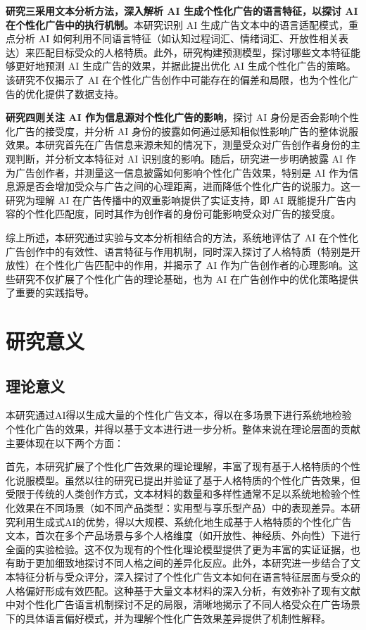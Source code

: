 \textbf{研究三采用文本分析方法，深入解析 AI 生成个性化广告的语言特征，以探讨 AI 在个性化广告中的执行机制。}本研究识别 AI 生成广告文本中的语言适配模式，重点分析 AI 如何利用不同语言特征（如认知过程词汇、情绪词汇、开放性相关表达）来匹配目标受众的人格特质。此外，研究构建预测模型，探讨哪些文本特征能够更好地预测 AI 生成广告的效果，并据此提出优化 AI 生成个性化广告的策略。该研究不仅揭示了 AI 在个性化广告创作中可能存在的偏差和局限，也为个性化广告的优化提供了数据支持。

\textbf{研究四则关注 AI 作为信息源对个性化广告的影响}，探讨 AI 身份是否会影响个性化广告的接受度，并分析 AI 身份的披露如何通过感知相似性影响广告的整体说服效果。本研究首先在广告信息来源未知的情况下，测量受众对广告创作者身份的主观判断，并分析文本特征对 AI 识别度的影响。随后，研究进一步明确披露 AI 作为广告创作者，并测量这一信息披露如何影响个性化广告效果，特别是 AI 作为信息源是否会增加受众与广告之间的心理距离，进而降低个性化广告的说服力。这一研究为理解 AI 在广告传播中的双重影响提供了实证支持，即 AI 既能提升广告内容的个性化匹配度，同时其作为创作者的身份可能影响受众对广告的接受度。

综上所述，本研究通过实验与文本分析相结合的方法，系统地评估了 AI 在个性化广告创作中的有效性、语言特征与作用机制，同时深入探讨了人格特质（特别是开放性）在个性化广告匹配中的作用，并揭示了 AI 作为广告创作者的心理影响。这些研究不仅扩展了个性化广告的理论基础，也为 AI 在广告创作中的优化策略提供了重要的实践指导。



\section{研究意义}

\subsection{理论意义}

本研究通过AI得以生成大量的个性化广告文本，得以在多场景下进行系统地检验个性化广告的效果，并得以基于文本进行进一步分析。整体来说在理论层面的贡献主要体现在以下两个方面：

首先，本研究扩展了个性化广告效果的理论理解，丰富了现有基于人格特质的个性化说服模型。虽然以往的研究已提出并验证了基于人格特质的个性化广告效果，但受限于传统的人类创作方式，文本材料的数量和多样性通常不足以系统地检验个性化效果在不同场景（如不同产品类型：实用型与享乐型产品）中的表现差异。本研究利用生成式AI的优势，得以大规模、系统化地生成基于人格特质的个性化广告文本，首次在多个产品场景与多个人格维度（如开放性、神经质、外向性）下进行全面的实验检验。这不仅为现有的个性化理论模型提供了更为丰富的实证证据，也有助于更加细致地探讨不同人格之间的差异化反应。此外，本研究进一步结合了文本特征分析与受众评分，深入探讨了个性化广告文本如何在语言特征层面与受众的人格偏好形成有效匹配。这种基于大量文本材料的深入分析，有效弥补了现有文献中对个性化广告语言机制探讨不足的局限，清晰地揭示了不同人格受众在广告场景下的具体语言偏好模式，并为理解个性化广告效果差异提供了机制性解释。


